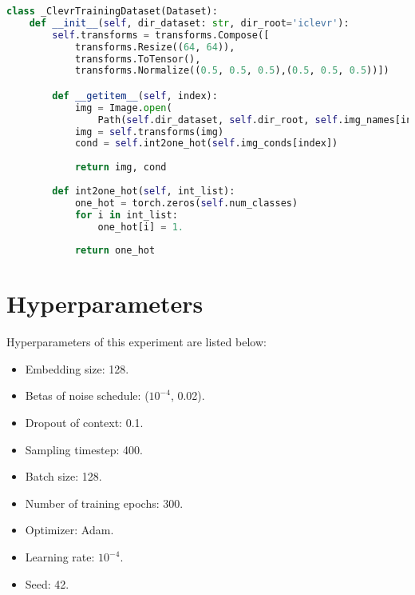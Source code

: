 \begin{lstlisting}[language=Python, caption={Python code of data pre-process and loader.}, label={data-loader-part}]
class _ClevrTrainingDataset(Dataset):
    def __init__(self, dir_dataset: str, dir_root='iclevr'):
        self.transforms = transforms.Compose([
            transforms.Resize((64, 64)),
            transforms.ToTensor(),
            transforms.Normalize((0.5, 0.5, 0.5),(0.5, 0.5, 0.5))])

        def __getitem__(self, index):
            img = Image.open(
                Path(self.dir_dataset, self.dir_root, self.img_names[index])).convert('RGB')
            img = self.transforms(img)
            cond = self.int2one_hot(self.img_conds[index])
            
            return img, cond
    
        def int2one_hot(self, int_list):
            one_hot = torch.zeros(self.num_classes)
            for i in int_list:
                one_hot[i] = 1.
                
            return one_hot\end{lstlisting}

\section{Hyperparameters}
\indent
    Hyperparameters of this experiment are listed below: 
    \begin{itemize}
        \item Embedding size: 128.
        \item Betas of noise schedule: ($10^{-4}$, 0.02).
        \item Dropout of context: 0.1.
        \item Sampling timestep: 400.
        \item Batch size: 128.
        \item Number of training epochs: 300.
        \item Optimizer: Adam.
        \item Learning rate: $10^{-4}$.
        \item Seed: 42.
    \end{itemize}
